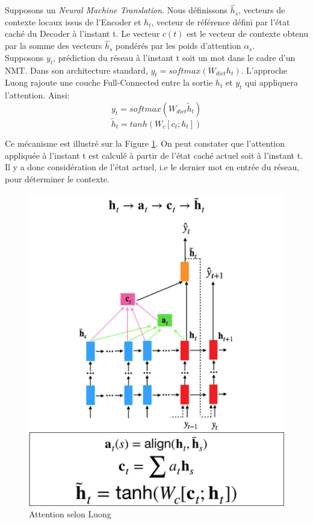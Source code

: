 \noindent Supposons un \textit{Neural Machine Translation}. Nous définissons $\hat{h}_s$, vecteurs de contexte locaux issus de l'Encoder et $h_t$, vecteur de référence défini par l'état caché du Decoder à l'instant t. Le vecteur $c(t)$ est le vecteur de contexte obtenu par la somme des vecteurs $\hat{h}_s$ pondérés par les poids d'attention $\alpha_s$.\\

\noindent Supposons $y_t$, prédiction du réseau à l'instant t soit un mot dans le cadre d'un NMT. Dans son architecture standard, $y_t=softmax(W_{dict}h_t)$. L'approche Luong rajoute une couche Full-Connected entre la sortie $h_t$ et $y_t$ qui appliquera l'attention. Ainsi:
$$y_t=softmax(W_{dict}\tilde{h}_t)$$
$$\tilde{h}_t=tanh(W_c[c_t;h_t])$$

\noindent Ce mécanisme est illustré sur la Figure \ref{luong}. On peut constater que l'attention appliquée à l'instant t est calculé à partir de l'état caché actuel soit à l'instant t. Il y a donc considération de l'état actuel, i.e le dernier mot en entrée du réseau, pour déterminer le contexte.

\begin{figure}
    \centering
    \includegraphics[scale=0.4]{./tex/attention-deep-learning/luongpic.png}
    \caption{Attention selon Luong}
    \label{luong}
\end{figure}

